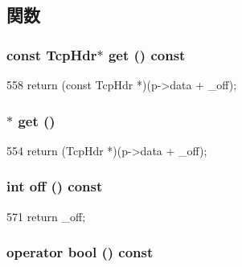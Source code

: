 \subsection{関数}
\hypertarget{classNet_1_1TcpPtr_a6d31bdfc8c5f84b6a4a791db973df4c2}{
\subsubsection[{get}]{\setlength{\rightskip}{0pt plus 5cm}const {\bf TcpHdr}$\ast$ get () const}}
\label{classNet_1_1TcpPtr_a6d31bdfc8c5f84b6a4a791db973df4c2}



\begin{DoxyCode}
558 { return (const TcpHdr *)(p->data + _off); }
\end{DoxyCode}
\hypertarget{classNet_1_1TcpPtr_ad425903dd5be36812b8cb0f3fc9c3b49}{
\subsubsection[{get}]{$\ast$ get ()}}
\label{classNet_1_1TcpPtr_ad425903dd5be36812b8cb0f3fc9c3b49}



\begin{DoxyCode}
554 { return (TcpHdr *)(p->data + _off); }
\end{DoxyCode}
\hypertarget{classNet_1_1TcpPtr_a81fa7ab0c6e92d4496ee915a8a3705f9}{
\subsubsection[{off}]{\setlength{\rightskip}{0pt plus 5cm}int off () const}}
\label{classNet_1_1TcpPtr_a81fa7ab0c6e92d4496ee915a8a3705f9}



\begin{DoxyCode}
571 { return _off; }
\end{DoxyCode}
\hypertarget{classNet_1_1TcpPtr_aa385aa18f5e42db5a415c25a90f4193d}{
\subsubsection[{operator bool}]{\setlength{\rightskip}{0pt plus 5cm}operator bool () const}}
\label{classNet_1_1TcpPtr_aa385aa18f5e42db5a415c25a90f4193d}



